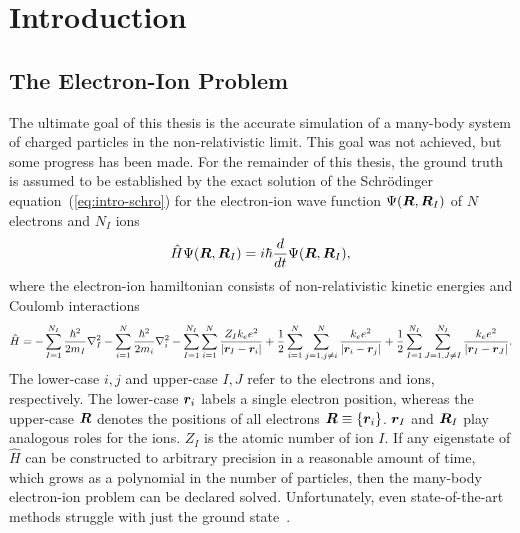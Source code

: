 \chapter{Introduction}

\section{The Electron-Ion Problem}
The ultimate goal of this thesis is the accurate simulation of a many-body system of charged particles in the non-relativistic limit.
This goal was not achieved, but some progress has been made.
For the remainder of this thesis, the ground truth is assumed to be established by the exact solution of the Schr\"odinger equation~(\ref{eq:intro-schro}) for the electron-ion wave function $\Psi(\boldsymbol{R},\boldsymbol{R}_I)$ of $N$ electrons and $N_I$ ions
\begin{align} \label{eq:intro-schro}
\hat{H} \Psi(\boldsymbol{R},\boldsymbol{R}_I) = i\hbar\frac{d}{dt}\Psi(\boldsymbol{R},\boldsymbol{R}_I),
\end{align}
where the electron-ion hamiltonian consists of non-relativistic kinetic energies and Coulomb interactions
\begin{align} \label{eq:intro-ei-ham}
\hat{H} =
-\sum\limits_{I=1}^{N_I} \frac{\hbar^2}{2m_I} \nabla^2_I
-\sum\limits_{i=1}^N \frac{\hbar^2}{2m_i}\nabla^2_i
-\sum\limits_{I=1}^{N_I}\sum\limits_{i=1}^N
\frac{Z_Ik_ee^2}{\vert\boldsymbol{r}_I-\boldsymbol{r}_i\vert}
+\frac{1}{2}\sum\limits_{i=1}^N\sum\limits_{j=1,j\neq i}^{N} \frac{k_ee^2}{\vert\boldsymbol{r}_i-\boldsymbol{r}_j\vert}
+\frac{1}{2}\sum\limits_{I=1}^{N_I}\sum\limits_{J=1,J\neq I}^{N_I} \frac{k_ee^2}{\vert\boldsymbol{r}_I-\boldsymbol{r}_J\vert}.
\end{align}
The lower-case $i,j$ and upper-case $I,J$ refer to the electrons and ions, respectively. The lower-case $\boldsymbol{r}_i$ labels a single electron position, whereas the upper-case $\boldsymbol{R}$ denotes the positions of all electrons $\boldsymbol{R}\equiv\{\boldsymbol{r}_i\}$. $\boldsymbol{r}_I$ and $\boldsymbol{R}_I$ play analogous roles for the ions. $Z_I$ is the atomic number of ion $I$. If any eigenstate of $\hat{H}$ can be constructed to arbitrary precision in a reasonable amount of time, which grows as a polynomial in the number of particles, then the many-body electron-ion problem can be declared solved. Unfortunately, even state-of-the-art methods struggle with just the ground state~\cite{Azadi2014,McMinis2015,Drummond2015}.

